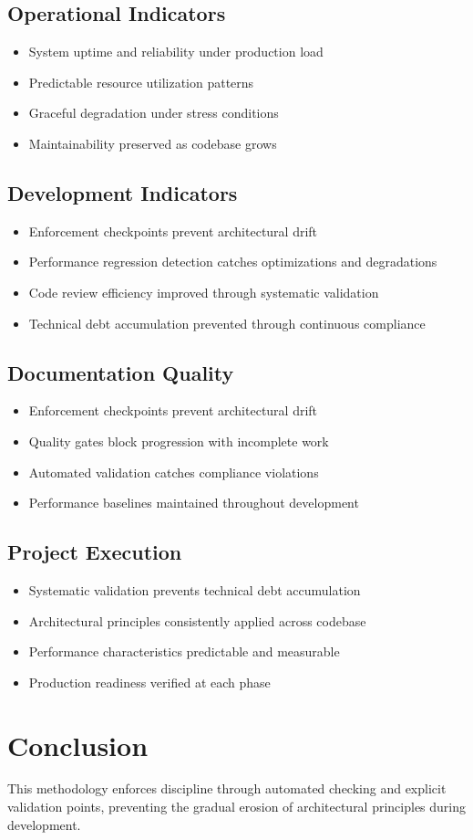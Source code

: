 \documentclass{article}
\begin{document}
\subsection{Operational Indicators}
\begin{itemize}[noitemsep]
\item System uptime and reliability under production load
\item Predictable resource utilization patterns
\item Graceful degradation under stress conditions
\item Maintainability preserved as codebase grows
\end{itemize}

\subsection{Development Indicators}
\begin{itemize}[noitemsep]
\item Enforcement checkpoints prevent architectural drift
\item Performance regression detection catches optimizations and degradations
\item Code review efficiency improved through systematic validation
\item Technical debt accumulation prevented through continuous compliance
\end{itemize}

\subsection{Documentation Quality}
\begin{itemize}[noitemsep]
\item Enforcement checkpoints prevent architectural drift
\item Quality gates block progression with incomplete work
\item Automated validation catches compliance violations
\item Performance baselines maintained throughout development
\end{itemize}

\subsection{Project Execution}
\begin{itemize}[noitemsep]
\item Systematic validation prevents technical debt accumulation
\item Architectural principles consistently applied across codebase
\item Performance characteristics predictable and measurable
\item Production readiness verified at each phase
\end{itemize}

\section{Conclusion}
This methodology enforces discipline through automated checking and explicit validation points, preventing the gradual erosion of architectural principles during development.
\end{document}
